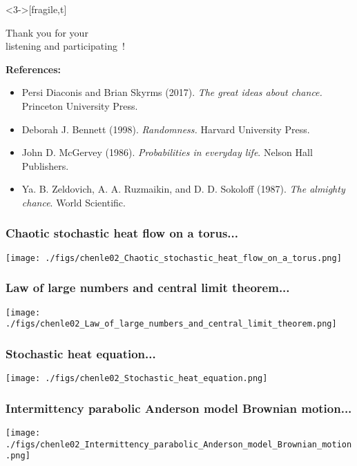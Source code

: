 \documentclass[9pt,xcolor=dvipsnames,table]{beamer}
\begin{document}
\begin{frame}<3->[fragile,t] %
  \vfill

 \begin{center}
   \huge

   Thank you for your \\
   listening and participating~!

 \end{center}
 \vfill

 {\noindent \bf References:}\\
 \begin{itemize}
   \item Persi Diaconis and Brian Skyrms (2017). \textit{The great ideas about chance.} Princeton
     University Press.
   \item Deborah J. Bennett (1998). \textit{Randomness.} Harvard University Press.
   \item John D. McGervey (1986). \textit{Probabilities in everyday life}. Nelson Hall Publishers.
   \item Ya. B. Zeldovich, A. A. Ruzmaikin, and D. D. Sokoloff (1987). \textit{The almighty chance}.
     World Scientific.
 \end{itemize}

\end{frame}
\begin{frame}[fragile,t] %
  \frametitle{Chaotic stochastic heat flow on a torus...}
  \begin{center}
    \texttt{[image: ./figs/chenle02\_Chaotic\_stochastic\_heat\_flow\_on\_a\_torus.png]}
  \end{center}
\end{frame}
\begin{frame}[fragile,t] %
  \frametitle{Law of large numbers and central limit theorem...}
  \begin{center}
    \texttt{[image: ./figs/chenle02\_Law\_of\_large\_numbers\_and\_central\_limit\_theorem.png]}
  \end{center}
\end{frame}
\begin{frame}[fragile,t] %
  \frametitle{Stochastic heat equation...}
  \begin{center}
    \texttt{[image: ./figs/chenle02\_Stochastic\_heat\_equation.png]}
  \end{center}
\end{frame}
\begin{frame}[fragile,t] %
  \frametitle{Intermittency parabolic Anderson model Brownian motion...}
  \begin{center}
    \texttt{[image: ./figs/chenle02\_Intermittency\_parabolic\_Anderson\_model\_Brownian\_motion.png]}
  \end{center}
\end{frame}
\end{document}
